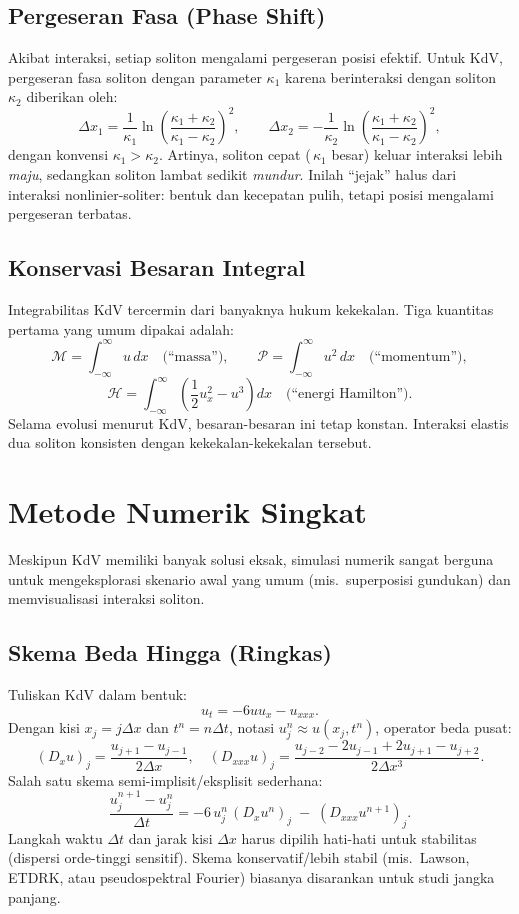 \documentclass{bukumjh}
\begin{document}
\subsection*{Pergeseran Fasa (Phase Shift)}
Akibat interaksi, setiap soliton mengalami pergeseran posisi efektif. 
Untuk KdV, pergeseran fasa soliton dengan parameter $\kappa_1$ karena berinteraksi dengan soliton $\kappa_2$ diberikan oleh:
\[
\Delta x_1 = \frac{1}{\kappa_1}\ln\!\left(\frac{\kappa_1+\kappa_2}{\kappa_1-\kappa_2}\right)^{\!2}, 
\qquad
\Delta x_2 = -\frac{1}{\kappa_2}\ln\!\left(\frac{\kappa_1+\kappa_2}{\kappa_1-\kappa_2}\right)^{\!2},
\]
dengan konvensi $\kappa_1>\kappa_2$. 
Artinya, soliton cepat (\,$\kappa_1$ besar) keluar interaksi lebih \emph{maju}, sedangkan soliton lambat sedikit \emph{mundur}. 
Inilah “jejak” halus dari interaksi nonlinier-soliter: bentuk dan kecepatan pulih, tetapi posisi mengalami pergeseran terbatas.

\subsection*{Konservasi Besaran Integral}
Integrabilitas KdV tercermin dari banyaknya hukum kekekalan. 
Tiga kuantitas pertama yang umum dipakai adalah:
\[
\mathcal{M}=\int_{-\infty}^{\infty} u\,dx \quad\text{(``massa'')}, \qquad
\mathcal{P}=\int_{-\infty}^{\infty} u^2\,dx \quad\text{(``momentum'')},
\]
\[
\mathcal{H}=\int_{-\infty}^{\infty}\left(\frac{1}{2}u_x^2 - u^3\right)\!dx \quad\text{(``energi Hamilton'')}.
\]
Selama evolusi menurut KdV, besaran-besaran ini tetap konstan. 
Interaksi elastis dua soliton konsisten dengan kekekalan-kekekalan tersebut.

\section{Metode Numerik Singkat}

Meskipun KdV memiliki banyak solusi eksak, simulasi numerik sangat berguna untuk mengeksplorasi skenario awal yang umum (mis.\ superposisi gundukan) dan memvisualisasi interaksi soliton.

\subsection*{Skema Beda Hingga (Ringkas)}
Tuliskan KdV dalam bentuk:
\[
u_t = -6uu_x - u_{xxx}.
\]
Dengan kisi $x_j=j\Delta x$ dan $t^n=n\Delta t$, notasi $u_j^n\approx u(x_j,t^n)$, operator beda pusat:
\[
(D_x u)_j = \frac{u_{j+1}-u_{j-1}}{2\Delta x}, \quad
(D_{xxx}u)_j = \frac{u_{j-2}-2u_{j-1}+2u_{j+1}-u_{j+2}}{2\Delta x^3}.
\]
Salah satu skema semi-implisit/eksplisit sederhana:
\[
\frac{u_j^{n+1}-u_j^{n}}{\Delta t} 
= -6\,u_j^{n}\,(D_x u^n)_j \;-\; (D_{xxx}u^{n+1})_j.
\]
Langkah waktu $\Delta t$ dan jarak kisi $\Delta x$ harus dipilih hati-hati untuk stabilitas (dispersi orde-tinggi sensitif). 
Skema konservatif/lebih stabil (mis.\ Lawson, ETDRK, atau pseudospektral Fourier) biasanya disarankan untuk studi jangka panjang.
\end{document}
